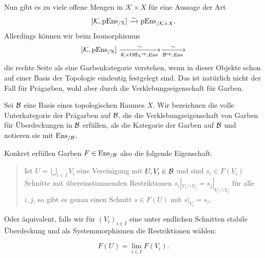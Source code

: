 Nun gibt es zu viele offene Mengen in $\mathcal{K} \times X$ für eine
Aussage der Art
\[
  [\mathcal{K}, \operatorname{pEns_{/X}}] \xrightarrow[]{\sim} \mathrm{pEns}_{/\mathcal{K} \times X}.
\]
Allerdings können wir beim Isomorphismus
\[
  [\mathcal{K}, \operatorname{pEns_{/X}}] \xrightarrow[\mathcal{K} \times \operatorname{Off_X}^\mathrm{op}, \operatorname{Ens}]{\sim} \xrightarrow[\mathcal{B}^\mathrm{op}, \operatorname{Ens}]{\sim}
\]
die rechte Seite als eine Garbenkategorie verstehen, wenn in dieser
Objekte schon auf einer Basis der Topologie eindeutig festgelegt
sind. Das ist natürlich nicht der Fall für Prägarben, wohl aber durch
die Verklebungseigenschaft für Garben.

\begin{defn}
  Sei $\mathcal{B}$ eine Basis eines topologischen Raumes $X$.  Wir
  bezeichnen die volle Unterkategorie der Prägarben auf $\mathcal{B}$,
  die die Verklebungseigenschaft von Garben für Überdeckungen in
  $\mathcal{B}$ erfüllen, als die Kategorie der Garben auf
  $\mathcal{B}$ und notieren sie mit $\operatorname{Ens_{/\mathcal{B}}}$.
\end{defn}

Konkret erfüllen Garben $F \in \operatorname{Ens_{/\mathcal{B}}}$ also die folgende
Eigenschaft:

\begin{quote}
  Ist $U = \bigcup_{i \in I} V_i$ eine Vereinigung mit $U, V_i \in
  \mathcal{B}$ und sind $s_i \in F(V_i)$ Schnitte mit
  übereinstimmenden Restriktionen $s_i |_{V_i \cap V_j} = s_j |_{V_i
    \cap V_j}$ für alle $i, j$, so gibt es genau einen Schnitt $s \in
  F(U)$ mit $s |_{V_i} = s_i$.
\end{quote}

Oder äquivalent, falls wir für $(V_i)_{i \in I}$ eine unter endlichen
Schnitten stabile Überdeckung und als Systemmorphismen die
Restriktionen wählen:

\[ F(U) = \lim_{i \in I} F(V_i) . \]

